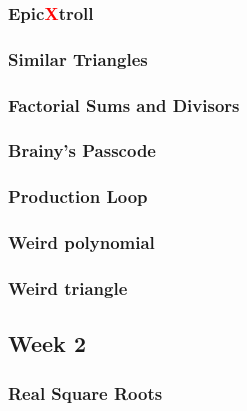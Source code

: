 \documentclass[titlepage=true]{scrartcl}
\begin{document}
        \subsubsection{Epic\textcolor{red}{X}troll}
        \label{10.1.1}
        
        \newpage

        \subsubsection{Similar Triangles}
        \label{10.1.2}  
        
        \newpage

        \subsubsection{Factorial Sums and Divisors}
        \label{10.1.3}  
        
        \newpage

        \subsubsection{Brainy's Passcode}
        \label{10.1.4}  
        
        \newpage

        \subsubsection{Production Loop}
        \label{10.1.5}  
        
        \newpage

        \subsubsection{Weird polynomial}
        \label{10.1.6}  
        
        \newpage
		
		\subsubsection{Weird triangle}
		\label{10.1.7}
		
		\newpage

    \subsection{Week 2}

        \subsubsection{Real Square Roots}
        \label{10.2.1}  
        
        \newpage
\end{document}
